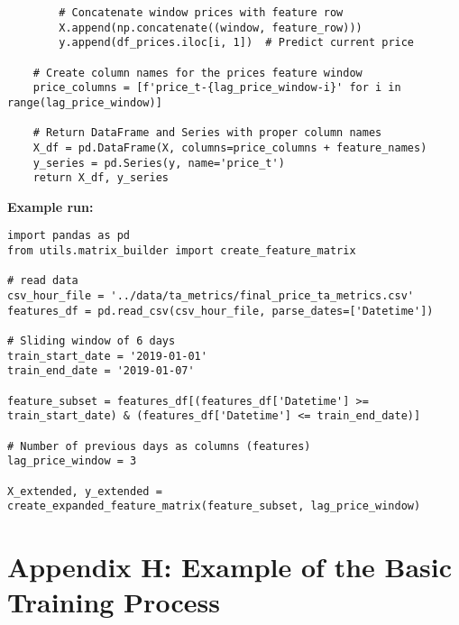 \documentclass[12pt]{report} %
\begin{document}
\begin{lstlisting}
        # Concatenate window prices with feature row
        X.append(np.concatenate((window, feature_row)))
        y.append(df_prices.iloc[i, 1])  # Predict current price

    # Create column names for the prices feature window
    price_columns = [f'price_t-{lag_price_window-i}' for i in range(lag_price_window)]

    # Return DataFrame and Series with proper column names
    X_df = pd.DataFrame(X, columns=price_columns + feature_names)
    y_series = pd.Series(y, name='price_t')
    return X_df, y_series
\end{lstlisting}

\noindent \textbf{Example run:}
\begin{lstlisting}
import pandas as pd
from utils.matrix_builder import create_feature_matrix

# read data
csv_hour_file = '../data/ta_metrics/final_price_ta_metrics.csv'
features_df = pd.read_csv(csv_hour_file, parse_dates=['Datetime'])

# Sliding window of 6 days
train_start_date = '2019-01-01'
train_end_date = '2019-01-07'

feature_subset = features_df[(features_df['Datetime'] >= train_start_date) & (features_df['Datetime'] <= train_end_date)]

# Number of previous days as columns (features)
lag_price_window = 3

X_extended, y_extended = create_expanded_feature_matrix(feature_subset, lag_price_window)
\end{lstlisting}



\chapter* {Appendix H: Example of the Basic Training Process}
\label{app:appendix_h_example_basic_training_process}
\end{document}
